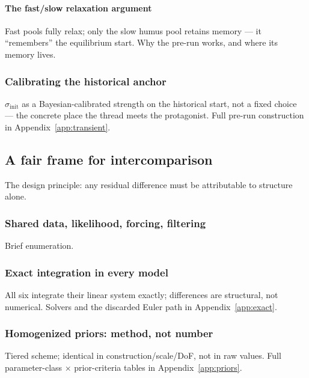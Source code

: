 \documentclass[11pt]{article}
\begin{document}
\paragraph{The fast/slow relaxation argument}
Fast pools fully relax; only the slow humus pool retains memory --- it
``remembers'' the equilibrium start. Why the pre-run works, and where its
memory lives.

\subsubsection{Calibrating the historical anchor}
$\sigma_{\mathrm{init}}$ as a Bayesian-calibrated strength on the historical
start, not a fixed choice --- the concrete place the thread meets the
protagonist. Full pre-run construction in Appendix~\ref{app:transient}.

\subsection{A fair frame for intercomparison}
The design principle: any residual difference must be attributable to
structure alone.

\subsubsection{Shared data, likelihood, forcing, filtering}
Brief enumeration.

\subsubsection{Exact integration in every model}
All six integrate their linear system exactly; differences are structural,
not numerical. Solvers and the discarded Euler path in
Appendix~\ref{app:exact}.

\subsubsection{Homogenized priors: method, not number}
Tiered scheme; identical in construction/scale/DoF, not in raw values. Full
parameter-class $\times$ prior-criteria tables in Appendix~\ref{app:priors}.
\end{document}
